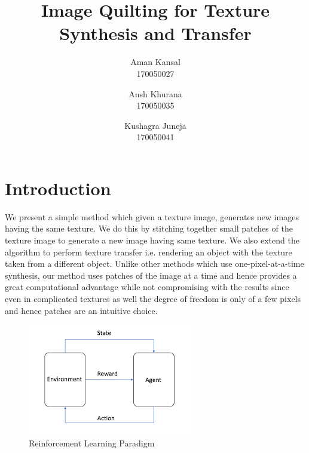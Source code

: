 \documentclass[10pt,twocolumn,letterpaper]{article}
\begin{document}
\title{Image Quilting for Texture Synthesis and Transfer}

\author{Aman Kansal\\
170050027\\
\and
Ansh Khurana\\
170050035\\
\and
Kushagra Juneja\\
170050041
}

\maketitle

   

\section{Introduction}
We present a simple method which given a texture image, generates new images having the same texture. We do this by stitching together small patches of the texture image to generate a new image having same texture. We also extend the algorithm to perform texture transfer i.e. rendering an object with the texture taken from a different object. Unlike other methods which use one-pixel-at-a-time synthesis, our method uses patches of the image at a time and hence provides a great computational advantage while not compromising with the results since even in complicated textures as well the degree of freedom is only of a few pixels and hence patches are an intuitive choice. 
\begin{figure}[h]
\begin{center}
\includegraphics[scale=0.50]{resources/rl_general.png}
\end{center}
\vspace{-0.2em}
\caption{Reinforcement Learning Paradigm}
\label{fig:basic}
\end{figure}
\vspace{-6pt}
\end{document}
